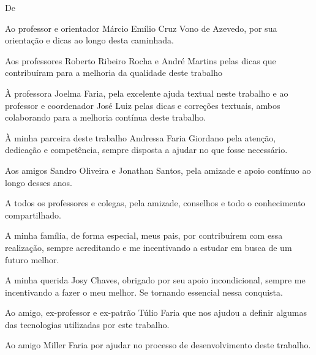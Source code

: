 \begin{agradecimentos}
\vspace*{\fill}
De \imprimirAutorDois
\newline

\par Ao professor e orientador Márcio Emílio Cruz Vono de Azevedo, por sua orientação e dicas ao longo desta caminhada.

\par Aos professores Roberto Ribeiro Rocha e André Martins pelas dicas que contribuíram para a melhoria da qualidade deste trabalho 

\par À professora Joelma Faria, pela excelente ajuda textual neste trabalho e ao professor e coordenador José Luiz pelas dicas e correções textuais, ambos colaborando para a melhoria contínua deste trabalho.

\par À minha parceira deste trabalho Andressa Faria Giordano pela atenção, dedicação e competência, sempre disposta a ajudar no que fosse necessário.

\par Aos amigos Sandro Oliveira e Jonathan Santos, pela amizade e apoio contínuo ao longo desses anos.

\par A todos os professores e colegas, pela amizade, conselhos e todo o conhecimento compartilhado.

\par A minha família, de forma especial, meus pais, por contribuírem com essa realização, sempre acreditando e me incentivando a estudar em busca de um futuro melhor.

\par A minha querida Josy Chaves, obrigado por seu apoio incondicional, sempre me incentivando a fazer o meu melhor. Se tornando essencial nessa conquista.

\par Ao amigo, ex-professor e ex-patrão Túlio Faria que nos ajudou a definir algumas das tecnologias utilizadas por este trabalho.

\par Ao amigo Miller Faria por ajudar no processo de desenvolvimento deste trabalho.

\end{agradecimentos}




